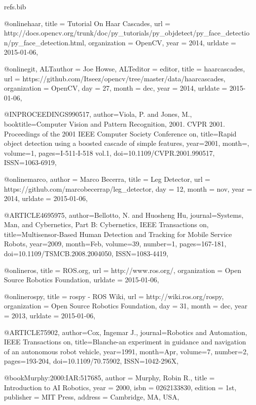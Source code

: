 \RequirePackage{filecontents}
\begin{filecontents}{refs.bib}

@online{haar,
title = {Tutorial On Haar Cascades},
url = {http://docs.opencv.org/trunk/doc/py\_tutorials/py\_objdetect/py\_face\_detection/py\_face\_detection.html},
organization = {OpenCV},
year = {2014},
urldate = {2015-01-06},
}

@online{git,
ALTauthor = {Joe Howse},
ALTeditor = {editor},
title = {haarcascades},
url = {https://github.com/Itseez/opencv/tree/master/data/haarcascades},
organization = {OpenCV},
day = {27},
month = {dec},
year = {2014},
urldate = {2015-01-06},
}

@INPROCEEDINGS{990517,
author={Viola, P. and Jones, M.},
booktitle={Computer Vision and Pattern Recognition, 2001. CVPR 2001. Proceedings of the 2001 IEEE Computer Society Conference on},
title={Rapid object detection using a boosted cascade of simple features},
year={2001},
month={},
volume={1},
pages={I-511-I-518 vol.1},
doi={10.1109/CVPR.2001.990517},
ISSN={1063-6919},}

@online{marco,
author = {Marco Becerra},
title = {Leg Detector},
url = {https://github.com/marcobecerrap/leg\_detector},
day = {12},
month = {nov},
year = {2014},
urldate = {2015-01-06},
}

@ARTICLE{4695975,
author={Bellotto, N. and Huosheng Hu},
journal={Systems, Man, and Cybernetics, Part B: Cybernetics, IEEE Transactions on},
title={Multisensor-Based Human Detection and Tracking for Mobile Service Robots},
year={2009},
month={Feb},
volume={39},
number={1},
pages={167-181},
doi={10.1109/TSMCB.2008.2004050},
ISSN={1083-4419},}

@online{ros,
title = {ROS.org},
url = {http://www.ros.org/}, %
organization = {Open Source Robotics Foundation},
urldate = {2015-01-06},
}

@online{rospy,
title = {rospy - ROS Wiki},
url = {http://wiki.ros.org/rospy},
organization = {Open Source Robotics Foundation},
day = {31},
month = {dec},
year = {2013},
urldate = {2015-01-06},
}

@ARTICLE{75902,
author={Cox, Ingemar J.},
journal={Robotics and Automation, IEEE Transactions on},
title={Blanche-an experiment in guidance and navigation of an autonomous robot vehicle},
year={1991},
month={Apr},
volume={7},
number={2},
pages={193-204},
doi={10.1109/70.75902},
ISSN={1042-296X},}

@book{Murphy:2000:IAR:517685,
 author = {Murphy, Robin R.},
 title = {Introduction to AI Robotics},
 year = {2000},
 isbn = {0262133830},
 edition = {1st},
 publisher = {MIT Press},
 address = {Cambridge, MA, USA},
}


\end{filecontents}
